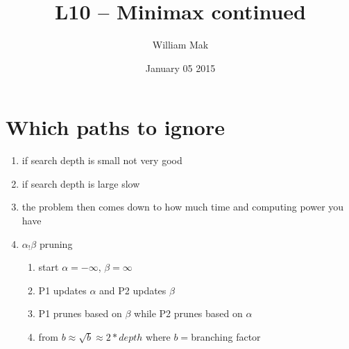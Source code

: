 \documentclass{article}
\title{L10 -- Minimax continued}
\author{William Mak}
\date{January 05 2015}
\begin{document}
\maketitle
\section{Which paths to ignore}
\begin{enumerate}
\item if search depth is small
  \subitem not very good
\item if search depth is large
  \subitem slow
\item the problem then comes down to how much time and computing power you have
\item $\alpha_!\beta$ pruning
  \begin{enumerate}
  \item start $\alpha=-\infty$, $\beta=\infty$
  \item P1 updates $\alpha$ and P2 updates $\beta$
  \item P1 prunes based on $\beta$ while P2 prunes based on $\alpha$
    \item from $b\approx\sqrt b \approx 2 * depth$ where $b=$branching factor
  \end{enumerate}
\end{enumerate}
  
\end{document}
